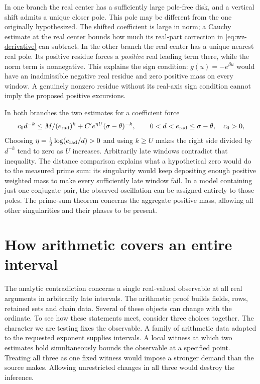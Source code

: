 \documentclass[12pt,letterpaper]{article}
\begin{document}
In one branch the real center has a sufficiently large pole-free disk, and a vertical shift admits a unique closer pole. This pole may be different from the one originally hypothesized. The shifted coefficient is large in norm; a Cauchy estimate at the real center bounds how much its real-part correction in \eqref{eq:wz-derivative} can subtract. In the other branch the real center has a unique nearest real pole. Its positive residue forces a \emph{positive} real leading term there, while the norm term is nonnegative. This explains the sign condition: \(g(u)=-e^{\beta u}\) would have an inadmissible negative real residue and zero positive mass on every window. A genuinely nonzero residue without its real-axis sign condition cannot imply the proposed positive excursions.  

In both branches the two estimates for a coefficient force
\[
       c_0d^{-k}\le M/(e_{\rm rad})^k
             + C'e^{\eta U}(\sigma-\theta)^{-k},
      \qquad 0<d<e_{\rm rad}\le \sigma-\theta,\quad c_0>0 ,
\]
Choosing \(\eta=\tfrac12\log(e_{\rm rad}/d)>0\) and using \(k\ge U\) makes the right side divided by \(d^{-k}\) tend to zero as \(U\) increases. Arbitrarily late windows contradict that inequality. The distance comparison explains what a hypothetical zero would do to the measured prime sum: its singularity would keep depositing enough positive weighted mass to make every sufficiently late window fail. In a model containing just one conjugate pair, the observed oscillation can be assigned entirely to those poles. The prime-sum theorem concerns the aggregate positive mass, allowing all other singularities and their phases to be present. 



\section{How arithmetic covers an entire interval}
\label{sec:arith_windows}

The analytic contradiction concerns a single real-valued observable at all real arguments in arbitrarily late intervals. The arithmetic proof builds fields, rows, retained sets and chain data. Several of these objects can change with the ordinate. To see how these statements meet, consider three choices together. The character we are testing fixes the observable. A family of arithmetic data adapted to the requested exponent supplies intervals. A local witness at which two estimates hold simultaneously bounds the observable at a specified point. Treating all three as one fixed witness would impose a stronger demand than the source makes. Allowing unrestricted changes in all three would destroy the inference.
\end{document}
